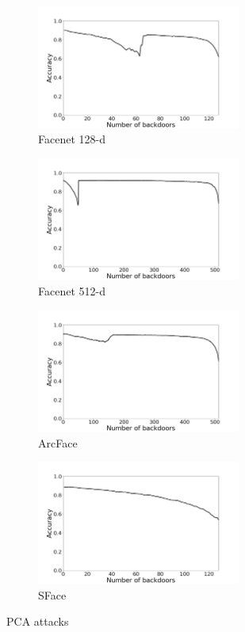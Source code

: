 \documentclass{article}
\theoremstyle{plain}
\theoremstyle{definition}
\theoremstyle{remark}
\begin{document}
\begin{figure}[t!]
    \centering
    \begin{subfigure}[t]{0.45\textwidth}
        \centering
        \includegraphics[height=1.6in]{figures/pca_attack_Facenet_opencv_cosine_all.png}
        \caption{Facenet 128-d}
    \end{subfigure}%
    \hfill 
    \begin{subfigure}[t]{0.45\textwidth}
        \centering
        \includegraphics[height=1.6in]{figures/pca_attack_Facenet512_opencv_cosine_all.png}
        \caption{Facenet 512-d}
    \end{subfigure}
    \hfill 
    \begin{subfigure}[t]{0.45\textwidth}
        \centering
        \includegraphics[height=1.6in]{figures/pca_attack_ArcFace_opencv_cosine_all.png}
        \caption{ArcFace}
    \end{subfigure}
    \hfill 
    \begin{subfigure}[t]{0.45\linewidth}
        \centering
        \includegraphics[height=1.6in]{figures/pca_attack_SFace_opencv_cosine_all.png}
        \caption{SFace}
    \end{subfigure}
    \caption{PCA attacks}
\end{figure}
\end{document}
